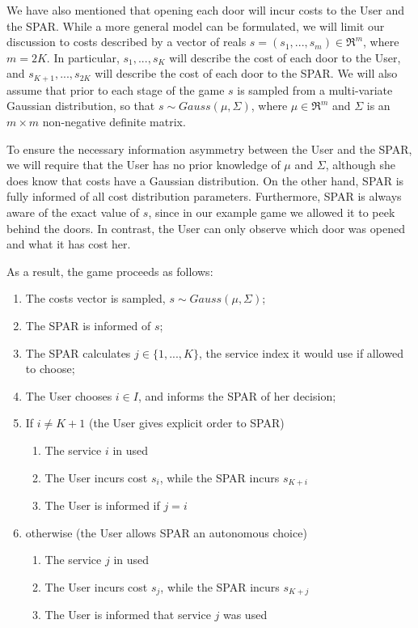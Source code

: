 \documentclass{msdm2012}
\begin{document}
We have also mentioned that opening each door will incur costs to the
User and the SPAR. While a more general model can be formulated, we will limit
our discussion to costs described by a vector of reals
$s=(s_1,...,s_m)\in\Re^m$, where $m=2K$. In particular, $s_1,...,s_K$
will describe the cost of each door to the User, and
$s_{K+1},...,s_{2K}$ will describe the cost of each door to the
SPAR. We will also assume that prior to each stage of the game $s$ is
sampled from a multi-variate Gaussian distribution, so that $s\sim
Gauss(\mu,\Sigma)$, where $\mu\in\Re^m$ and $\Sigma$ is an $m\times m$
non-negative definite matrix.

To ensure the necessary information asymmetry between the User and the
SPAR, we will require that the User has no prior knowledge of $\mu$
and $\Sigma$, although she does know that costs have a Gaussian
distribution. On the other hand, SPAR is fully informed of all cost
distribution parameters. Furthermore, SPAR is always aware of the
exact value of $s$, since in our example game we allowed it to peek
behind the doors. In contrast, the User can only observe which
door was opened and what it has cost her.

As a result, the game proceeds as follows:
\begin{enumerate}
\item The costs vector is sampled, $s\sim Gauss(\mu,\Sigma)$;
\item The SPAR is informed of $s$;
\item The SPAR calculates $j\in \{1,...,K\}$, the service index it would use if allowed to choose;
\item The User chooses $i\in I$, and informs the SPAR of her decision;
\item If $i\neq K+1$ (the User gives explicit order to SPAR)
\begin{enumerate}
\item The service $i$ in used
\item The User incurs cost $s_i$, while the SPAR incurs $s_{K+i}$
\item The User is informed if $j=i$
\end{enumerate}
\item[]otherwise (the User allows SPAR an autonomous choice)
\begin{enumerate}
\item The service $j$ in used
\item The User incurs cost $s_j$, while the SPAR incurs $s_{K+j}$ 
\item The User is informed that service $j$ was used
\end{enumerate}
\end{enumerate}
\end{document}
